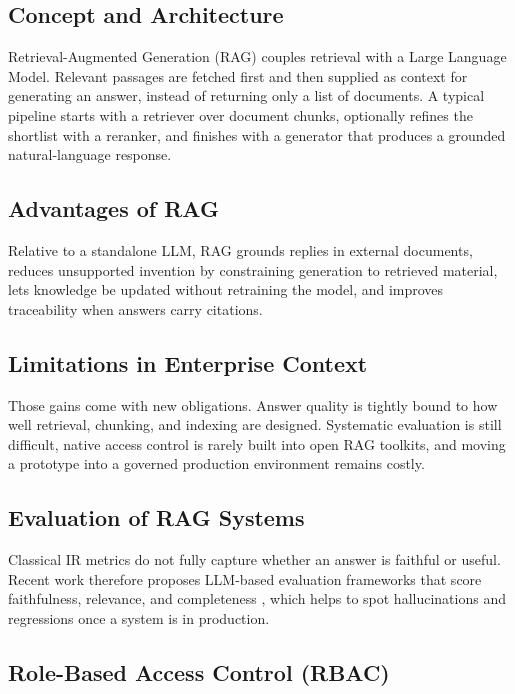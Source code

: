 \subsection{Concept and Architecture}

Retrieval-Augmented Generation (RAG) \cite{lewis2020rag} couples retrieval with a
Large Language Model. Relevant passages are fetched first and then supplied as
context for generating an answer, instead of returning only a list of documents.
A typical pipeline starts with a retriever over document chunks, optionally
refines the shortlist with a reranker, and finishes with a generator that produces
a grounded natural-language response.

\subsection{Advantages of RAG}

Relative to a standalone LLM, RAG grounds replies in external documents, reduces
unsupported invention by constraining generation to retrieved material, lets
knowledge be updated without retraining the model, and improves traceability when
answers carry citations.

\subsection{Limitations in Enterprise Context}

Those gains come with new obligations. Answer quality is tightly bound to how
well retrieval, chunking, and indexing are designed. Systematic evaluation is
still difficult, native access control is rarely built into open RAG toolkits,
and moving a prototype into a governed production environment remains costly.

\subsection{Evaluation of RAG Systems}

Classical IR metrics do not fully capture whether an answer is faithful or
useful. Recent work therefore proposes LLM-based evaluation frameworks that score
faithfulness, relevance, and completeness \cite{es2024rag-eval}, which helps to
spot hallucinations and regressions once a system is in production.

\subsection{Role-Based Access Control (RBAC)}

